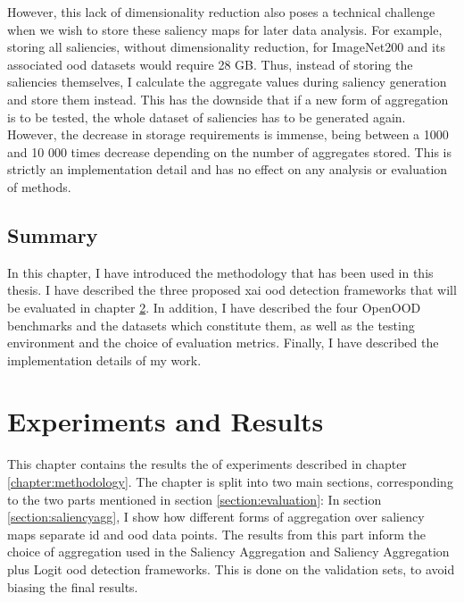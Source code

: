 \documentclass[UKenglish]{uiomasterthesis} %
\theoremstyle{definition}
\begin{document}
However, this lack of dimensionality reduction also poses a technical challenge when we wish to store these saliency maps for later data analysis. For example, storing all saliencies, without dimensionality reduction, for ImageNet200 and its associated \ac{ood} datasets would require 28 GB. Thus, instead of storing the saliencies themselves, I calculate the aggregate values during saliency generation and store them instead. This has the downside that if a new form of aggregation is to be tested, the whole dataset of saliencies has to be generated again. However, the decrease in storage requirements is immense, being between a 1000 and 10 000 times decrease depending on the number of aggregates stored. This is strictly an implementation detail and has no effect on any analysis or evaluation of methods.

\section{Summary}

In this chapter, I have introduced the methodology that has been used in this thesis. I have described the three proposed \ac{xai} \ac{ood} detection frameworks that will be evaluated in chapter \ref{chapter:experiments}. In addition, I have described the four OpenOOD benchmarks and the datasets which constitute them, as well as the testing environment and the choice of evaluation metrics. Finally, I have described the implementation details of my work.

\chapter{Experiments and Results} \label{chapter:experiments}

This chapter contains the results the of experiments described in chapter \ref{chapter:methodology}. The chapter is split into two main sections, corresponding to the two parts mentioned in section \ref{section:evaluation}: In section \ref{section:saliencyagg}, I show how different forms of aggregation over saliency maps separate \ac{id} and \ac{ood} data points. The results from this part inform the choice of aggregation used in the Saliency Aggregation and Saliency Aggregation plus Logit \ac{ood} detection frameworks. This is done on the validation sets, to avoid biasing the final results.
\end{document}
